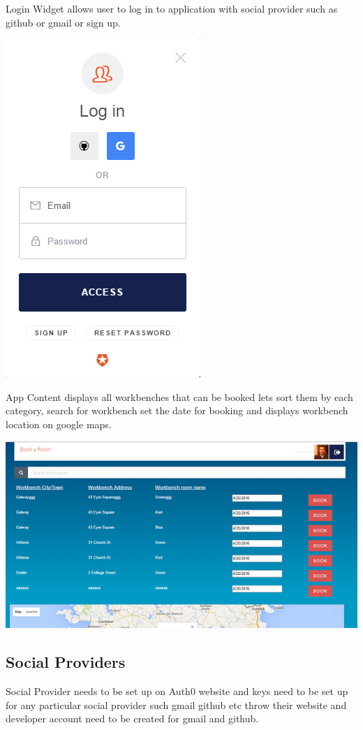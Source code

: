 \begin{itemize}
Login Widget allows user to log in to application with social provider such as github or gmail or sign up.
\begin{center}    
	\includegraphics{img/Widget.png}
\end{center}
\pagebreak
App Content displays all workbenches that can be booked lets sort them by each category, search for workbench set the date for booking and displays workbench location on google maps. 
\begin{center}    
	\includegraphics{img/AppContent.png}
\end{center}


\subsection{Social Providers}
Social Provider needs to be set up on Auth0 website and keys need to be set up for any particular social provider such gmail github etc throw their website and developer account need to be created for gmail and github.


\end{itemize}

